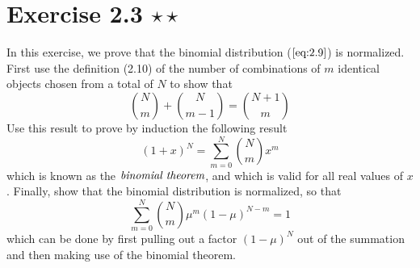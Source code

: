 \section*{Exercise 2.3 $\star \star$}
In this exercise, we prove that the binomial distribution ($\ref{eq:2.9}$)
is normalized. First use the definition (2.10) of the number of combinations of
$m$ identical objects chosen from a total of $N$ to show that
\begin{equation}\label{eq:2.262}\tag{2.262}
    \binom{N}{m} + \binom{N}{m-1} = \binom{N+1}{m}
\end{equation}
Use this result to prove by induction the following result
\begin{equation}\label{eq:2.263}\tag{2.263}
    (1 + x)^N = \sum_{m=0}^{N} \binom{N}{m}x^m
\end{equation}
which is known as the $\emph{binomial theorem}$, and which is valid 
for all real values of $x$. 
Finally, show that the binomial distribution is normalized, so that
\begin{equation}\label{eq:2.264}\tag{2.264}
    \sum_{m=0}^{N} \binom{N}{m} \mu^m(1 - \mu)^{N - m} = 1 
\end{equation}
which can be done by first pulling out a factor $(1 - \mu)^N$ out of the summation
and then making use of the binomial theorem.

